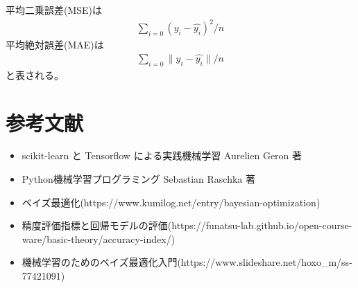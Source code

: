 \documentclass{jsarticle}
\begin{document}
平均二乗誤差(MSE)は
\begin{eqnarray*}
    \sum_{i=0} (y_i - \hat{y_i})^2 / n
\end{eqnarray*}
平均絶対誤差(MAE)は
\begin{eqnarray*}
    \sum_{i=0} \|y_i - \hat{y_i}\| / n
\end{eqnarray*}
と表される。


\section{参考文献}
\begin{itemize}
    \item scikit-learn と Tensorflow による実践機械学習 Aurelien Geron 著
    \item Python機械学習プログラミング Sebastian Raschka 著
    \item ベイズ最適化(https://www.kumilog.net/entry/bayesian-optimization)
    \item 精度評価指標と回帰モデルの評価(https://funatsu-lab.github.io/open-course-ware/basic-theory/accuracy-index/)
    \item 機械学習のためのベイズ最適化入門(https://www.slideshare.net/hoxo\_m/ss-77421091)
\end{itemize}
\end{document}
